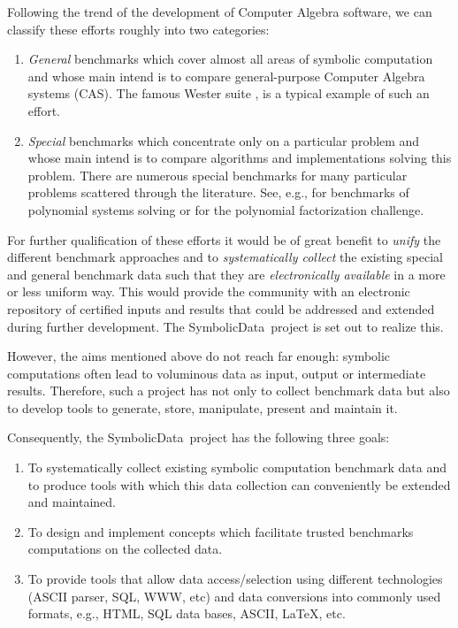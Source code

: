 \documentclass[11pt,a4paper]{article}
\newcommand{\SD}{{\sc Symbolic\-Data}}
\begin{document}
Following the trend of the development of Computer Algebra software, we
can classify these efforts roughly into two categories: 
\begin{enumerate}
\item {\em General} benchmarks which cover almost all areas of
symbolic computation and whose main intend is to compare
general-purpose Computer Algebra systems (CAS). The famous
Wester suite \cite[ch.3]{WesterBook}, is a typical example of such an
effort.
\item {\em Special} benchmarks which concentrate only on a particular
problem and whose main intend is to compare algorithms and
implementations solving this problem. There are numerous special
benchmarks for many particular problems scattered through the
literature. See, e.g., \cite{Bini, Boege_86a, Czapor_86a, PoSSo,
Wang_92a, Wang_96a} for benchmarks of polynomial systems solving or
\cite{Gathen_82, Factorization} for the polynomial factorization
challenge.
\end{enumerate}

For further qualification of these efforts it would be of great
benefit to {\em unify} the different benchmark approaches and to {\em
systematically collect} the existing special and general benchmark
data such that they are {\em electronically available} in a more or
less uniform way. This would provide the community with an electronic
repository of certified inputs and results that could be addressed and
extended during further development. The \SD\ project is set out to
realize this.

However, the aims mentioned above do not reach far enough: symbolic
computations often lead to voluminous data as input, output or
intermediate results. Therefore, such a project has not only to
collect benchmark data but also to develop tools to generate, store,
manipulate, present and maintain it.

Consequently, the \SD\  project has the following three goals:
\begin{enumerate}
\item To systematically collect existing symbolic computation
  benchmark data and to produce tools with which this data collection
  can conveniently be extended and maintained.
\item To design and implement concepts which facilitate trusted
  benchmarks computations on the collected data.
\item To provide tools that allow data access/selection using
different technologies (ASCII parser, SQL, WWW, etc) and data
conversions into commonly used formats, e.g., HTML, SQL data bases,
ASCII, LaTeX, etc.
\end{enumerate}
\end{document}
